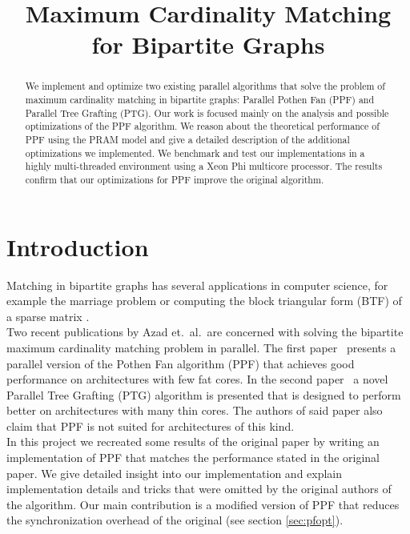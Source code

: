 \documentclass[letterpaper]{article}
\title{Maximum Cardinality Matching for Bipartite Graphs}
\begin{document}
%
\maketitle
%


\begin{abstract}

We implement and optimize two existing parallel algorithms that solve the problem of maximum cardinality matching in bipartite graphs: Parallel Pothen Fan (PPF) and Parallel Tree Grafting (PTG). Our work is focused mainly on the analysis and possible optimizations of the PPF algorithm. We reason about the theoretical performance of PPF using the PRAM model and give a detailed description of the additional optimizations we implemented. We benchmark and test our implementations in a highly multi-threaded environment using a Xeon Phi multicore processor. The results confirm that our optimizations for PPF improve the original algorithm. 

\end{abstract}

\section{Introduction}\label{sec:intro}

Matching in bipartite graphs has several applications in computer science, for example the marriage problem or computing the block triangular 
form (BTF) of a sparse matrix \cite{Pothen:1990}.\\

Two recent publications by Azad et.\ al.\ are concerned with solving the bipartite maximum cardinality matching problem in parallel. 
The first paper~\cite{Azad:2012} presents a parallel version of the Pothen Fan algorithm (PPF) that achieves good performance 
on architectures with few fat cores. In the second paper~\cite{Azad:2015} a novel Parallel Tree Grafting (PTG) algorithm is presented 
that is designed to perform better on architectures with many thin cores. 
The authors of said paper also claim that PPF is not suited for architectures of this kind.\\

In this project we recreated some results of the original paper \cite{Azad:2012} by writing an implementation of PPF
that matches the performance stated in the original paper. We give detailed insight into our implementation and explain
implementation details and tricks that were omitted by the original authors of the algorithm. 
Our main contribution is a modified version of PPF that reduces the synchronization overhead of the original (see section \ref{sec:pfopt}).\\
\end{document}
